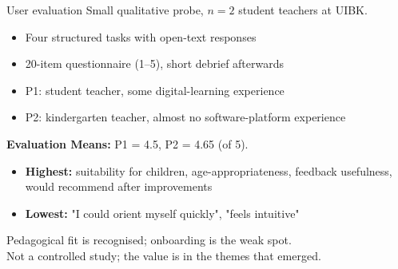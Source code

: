 \documentclass[11pt,t,usepdftitle=false,aspectratio=169]{beamer}
\begin{document}
\begin{frame}{User evaluation}
  Small qualitative probe, $n = 2$ student teachers at UIBK.
  \begin{itemize}
    \item Four structured tasks with open-text responses
    \item 20-item questionnaire (1--5), short debrief afterwards
    \item P1: student teacher, some digital-learning experience
    \item P2: kindergarten teacher, almost no software-platform experience
  \end{itemize}
  \vspace{0.2cm}
  \textbf{Evaluation Means:} P1 = 4.5, P2 = 4.65 (of 5).
  \begin{itemize}
    \item \textbf{Highest:} suitability for children, age-appropriateness,
          feedback usefulness, would recommend after improvements
    \item \textbf{Lowest:} "I could orient myself quickly", "feels intuitive"
  \end{itemize}
  Pedagogical fit is recognised; onboarding is the weak spot.\\
  Not a controlled study; the value is in the themes that emerged.
\end{frame}

\end{document}
